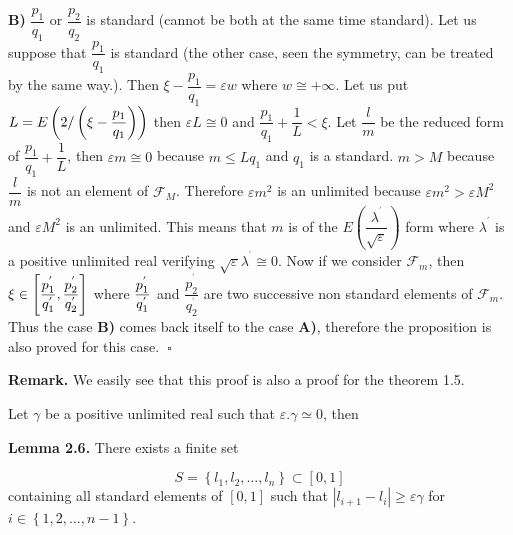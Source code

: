 \documentclass[12pt]{article}
\begin{document}
\noindent \textbf{B) }$\dfrac{p_{1}}{q_{1}}$ or $\dfrac{p_{2}}{q_{2}}$ is
standard (cannot be both at the same time standard). Let us suppose that $%
\dfrac{p_{1}}{q_{1}}$ is standard (the other case, seen the symmetry, can be
treated by the same way.). Then $\xi -\dfrac{p_{1}}{q_{1}}=\varepsilon w$
where $w\cong +\infty $. Let us put $L=E\left( 2/\left( \xi -\dfrac{p_{1}}{%
q_{1}}\right) \right) $ then $\varepsilon L\cong 0$ and $\dfrac{p_{1}}{q_{1}}%
+\dfrac{1}{L}<\xi $. Let $\dfrac{l}{m}$ be the reduced form of $\dfrac{p_{1}%
}{q_{1}}+\dfrac{1}{L}$, then $\varepsilon m\cong 0$ because $m\leq Lq_{1}$
and $q_{1}$ is a standard. $m>M$ because $\dfrac{l}{m}$ is not an element of 
$\mathcal{F}_{M}$. Therefore $\varepsilon m^{2}$ is an unlimited because $%
\varepsilon m^{2}>\varepsilon M^{2}$ and $\varepsilon M^{2}$ is an
unlimited. This means that $m$ is of the $E\left( \dfrac{\lambda ^{^{\prime
}}}{\sqrt{\varepsilon }}\right) $ form where $\lambda ^{^{\prime }}$ is a
positive unlimited real verifying $\sqrt{\varepsilon }\lambda ^{^{\prime
}}\cong 0$. Now if we consider $\mathcal{F}_{m}$, then $\xi \in \left[ 
\dfrac{p_{1}^{^{\prime }}}{q_{1}^{^{\prime }}},\dfrac{p_{2}^{^{\prime }}}{%
q_{2}^{^{\prime }}}\right] $ where $\dfrac{p_{1}^{^{\prime }}}{%
q_{1}^{^{\prime }}}$ and $\dfrac{p_{2}^{^{\prime }}}{q_{2}^{^{\prime }}}$
are two successive non standard elements of $\mathcal{F}_{m}$. Thus the case 
\textbf{B)} comes back itself to the case \textbf{A)}, therefore the
proposition is also proved for this case.\textbf{\ }$\square $\newline

\noindent \textbf{Remark.} We easily see that this proof is also a proof for
the theorem 1.5.\newline

Let $\gamma $ be a positive unlimited real such that $\varepsilon .\gamma
\simeq 0$, then\newline

\noindent \textbf{Lemma 2.6. }There exists a finite set

\begin{equation}
S=\left\{ l_{1},l_{2},...,l_{n}\right\} \subset \left[ 0,1\right]  \tag{2.5}
\end{equation}%
containing all standard elements of $\left[ 0,1\right] $ such that $%
\left\vert l_{i+1}-l_{i}\right\vert \geq \varepsilon \gamma $ for $i\in
\left\{ 1,2,...,n-1\right\} $.\newline
\end{document}
